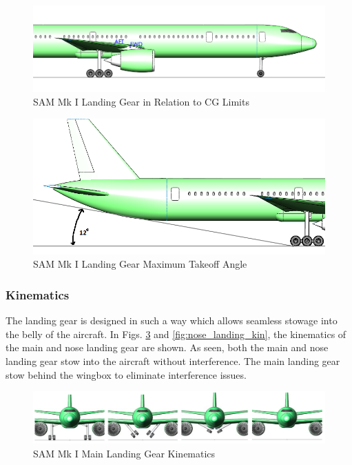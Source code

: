 \begin{figure}[!h]
    \centering
    \includegraphics[width=\linewidth]{Photos/landinggear/LG Close Side View with CG.PNG}
    \caption{SAM Mk I Landing Gear in Relation to CG Limits}
    \label{fig:landing_gear_CG}
\end{figure}
\begin{figure}[!h]
    \centering
    \includegraphics[width=\linewidth]{Photos/landinggear/Landing Gear Angle.PNG}
    \caption{SAM Mk I Landing Gear Maximum Takeoff Angle}
    \label{fig:gear_angle}
\end{figure}

\subsubsection{Kinematics}
The landing gear is designed in such a way which allows seamless stowage into the belly of the aircraft. In Figs. \ref{fig:main_landing_kin} and \ref{fig:nose_landing_kin}, the kinematics of the main and nose landing gear are shown. As seen, both the main and nose landing gear stow into the aircraft without interference. The main landing gear stow behind the wingbox to eliminate interference issues.

\begin{figure}[!h]
    \centering
    \includegraphics[width=\linewidth]{Photos/landinggear/Main Gear Kinematics.PNG}
    \caption{SAM Mk I Main Landing Gear Kinematics}
    \label{fig:main_landing_kin}
\end{figure}

